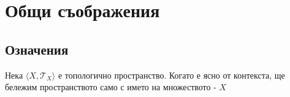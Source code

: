 

\section{Общи съображения}
\subsection{Означения}
\begin{notation}
    Нека $\langle X, \mathcal T_X\rangle$ е топологично пространство. Когато е ясно от контекста, ще бележим пространството само с името на множеството - $X$
\end{notation}


